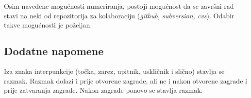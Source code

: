 Osim navedene mogućnosti numeriranja, postoji mogućnost da se završni rad stavi na neki od repozitorija za kolaboraciju (\textit{github, subversion, cvs}). Odabir takve mogućnosti je poželjan.

\subsection{Dodatne napomene}

Iza znaka interpunkcije (točka, zarez, upitnik, uskličnik i slično) stavlja se razmak. Razmak dolazi i prije otvorene zagrade, ali ne i nakon otvorene zagrade i prije zatvaranja zagrade. 
Nakon zagrade ponovo se stavlja razmak.
